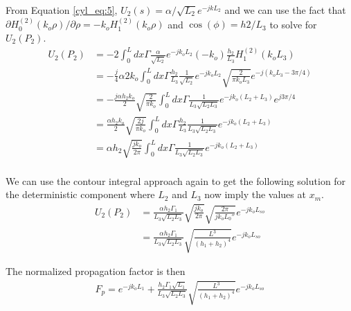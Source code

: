 From Equation \ref{cyl_eq:5}, $U_2(s) = \alpha/\sqrt{L_2} e^{-jkL_2}$ and we can use the fact that $\partial H_0^{(2)}(k_o\rho)/\partial \rho = -k_oH_1^{(2)}(k_o\rho)$ and $\cos(\phi) = h2/L_3$ to solve for $U_2(P_2)$.
\begin{equation}
\begin{aligned}
U_2(P_2) &= -2\int_0^L dx \Gamma\frac{\alpha}{\sqrt{L_2}}e^{-jk_oL_2}(-k_o)\frac{h_2}{L_3}H_1^{(2)}(k_oL_3)\\
&= -\frac{j}{4}\alpha 2k_o\int_0^L dx \Gamma\frac{h_2}{L_3}\frac{1}{\sqrt{L_2}}e^{-jk_oL_2}\sqrt{\frac{2}{\pi k_o L_3}}e^{-j(k_oL_3-3\pi /4)}\\
&=-\frac{j\alpha h_2k_o }{2}\sqrt{\frac{2}{\pi k_o}}\int_0^L dx\Gamma \frac{1}{L_3\sqrt{L_2L_3}}e^{-jk_o(L_2+L_3)}e^{j3\pi/4}\\
&= \frac{\alpha h_2k_o}{2}\sqrt{\frac{2j}{\pi k_o}}\int_0^L dx\Gamma \frac{h_2}{L_3} \frac{1}{L_3\sqrt{L_2L_3}}e^{-jk_o(L_2+L_3)}\\
&= \alpha h_2\sqrt{\frac{j k_o}{2\pi}}\int_0^L dx \Gamma\frac{1}{L_3\sqrt{L_2L_3}}e^{-jk_o(L_2+L_3)}\\
\end{aligned}
\label{cyl_eq:7}
\end{equation}

We can use the contour integral approach again to get the following solution for the deterministic component where $L_2$ and $L_3$ now imply the values at $x_m$.
\begin{equation}
\begin{aligned}
U_2(P_2) &=\frac{\alpha h_2\Gamma_1}{L_3\sqrt{L_2L_3}}\sqrt{\frac{j k_o}{2\pi}}\sqrt{\frac{2\pi}{j k_oL_0''}}e^{-jk_oL_{so}}\\
&=\frac{\alpha h_2\Gamma_1}{L_3\sqrt{L_2L_3}}\sqrt{\frac{L^3}{(h_1+h_2)^4}}
e^{-jk_oL_{so} }\end{aligned}
\label{cyl_eq:8}
\end{equation}

The normalized propagation factor is then
\begin{equation}
\begin{aligned}
\boxed{F_p =e^{-jk_oL_1} + \frac{h_2\Gamma_1\sqrt{L_1}}{L_3\sqrt{L_2L_3}}\sqrt{\frac{L^3}{(h_1+h_2)^4}}e^{-jk_oL_{so} }}
\end{aligned}
\label{cyl_eq:9}
\end{equation}
